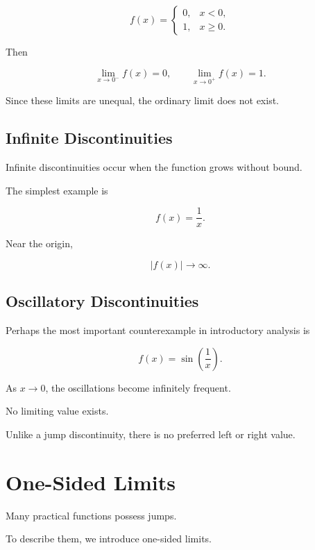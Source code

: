 \documentclass{essay}
\begin{document}
\begin{example}

\[
f(x)=
\begin{cases}
0,&x<0,\\
1,&x\ge0.
\end{cases}
\]

Then

\[
\lim_{x\to0^-}f(x)=0,
\qquad
\lim_{x\to0^+}f(x)=1.
\]

Since these limits are unequal, the ordinary limit does not exist.

\end{example}


\subsection{Infinite Discontinuities}

Infinite discontinuities occur when the function grows without bound.

The simplest example is

\[
f(x)=\frac1x.
\]

Near the origin,

\[
|f(x)|\rightarrow\infty.
\]


\subsection{Oscillatory Discontinuities}

Perhaps the most important counterexample in introductory analysis is

\[
f(x)=
\sin\left(\frac1x\right).
\]

As \(x\rightarrow0\), the oscillations become infinitely frequent.

No limiting value exists.

Unlike a jump discontinuity, there is no preferred left or right value.


\section{One-Sided Limits}

Many practical functions possess jumps.

To describe them, we introduce one-sided limits.
\end{document}
